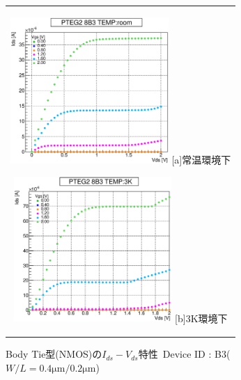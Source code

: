 			\begin{figure}[htbp]
				\begin{center}
					\begin{tabular}{c}
						\begin{minipage}{0.5\hsize}
							\begin{center}
								\includegraphics[clip, width=6cm]{./Chapter/Appendix/Picture/NBT/B3/PTEG2_8_B3_IdVd_room.eps}
								\hspace{1.6cm} [a]常温環境下
							\end{center}
						\end{minipage}
						\begin{minipage}{0.5\hsize}
							\begin{center}
								\includegraphics[clip, width=6cm]{./Chapter/Appendix/Picture/NBT/B3/PTEG2_8_B3_IdVd_3K.eps}
								\hspace{1.6cm} [b]3K環境下
							\end{center}
						\end{minipage}
					\end{tabular}
					\caption{Body Tie型(NMOS)の$I_{ds}-V_{ds}$特性\ Device ID : B3($W/L = 0.4\mathrm{\mu m} / 0.2\mathrm{\mu m}$)}
					\label{fig:BT_N_IdVd}
				\end{center}
			\end{figure}
			
			\clearpage
			
